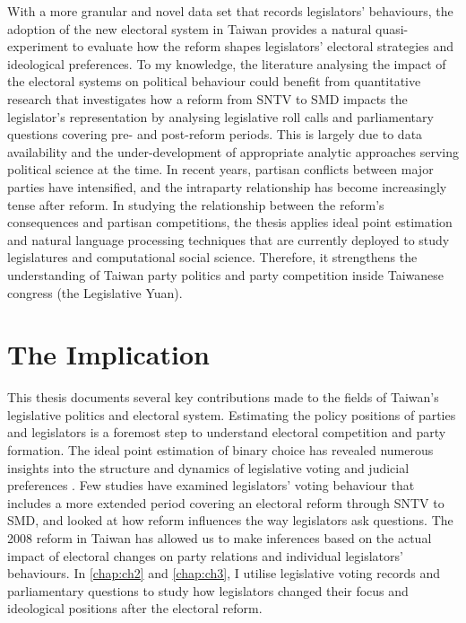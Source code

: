 With a more granular and novel data set that records legislators' behaviours, the adoption of the new electoral system in Taiwan provides a natural quasi-experiment to evaluate how the reform shapes legislators' electoral strategies and ideological preferences. To my knowledge, the literature analysing the impact of the electoral systems on political behaviour could benefit from quantitative research that investigates how a reform from SNTV to SMD impacts the legislator's representation by analysing legislative roll calls and parliamentary questions covering pre- and post-reform periods. This is largely due to data availability and the under-development of appropriate analytic approaches serving political science at the time. In recent years, partisan conflicts between major parties have intensified, and the intraparty relationship has become increasingly tense after reform. In studying the relationship between the reform's consequences and partisan competitions, the thesis applies ideal point estimation and natural language processing techniques that are currently deployed to study legislatures and computational social science. Therefore, it strengthens the understanding of Taiwan party politics and party competition inside Taiwanese congress (the Legislative Yuan). 

\section*{\centering The Implication}
This thesis documents several key contributions made to the fields of Taiwan's legislative politics and electoral system. Estimating the policy positions of parties and legislators is a foremost step to understand electoral competition and party formation. The ideal point estimation of binary choice has revealed numerous insights into the structure and dynamics of legislative voting \citep[e.g.,][]{Carroll2013, Gray2019} and judicial preferences \citep[][]{Martin2007, Epstein2007}. Few studies have examined legislators' voting behaviour that includes a more extended period covering an electoral reform through SNTV to SMD, and looked at how reform influences the way legislators ask questions. The 2008 reform in Taiwan has allowed us to make inferences based on the actual impact of electoral changes on party relations and individual legislators' behaviours. In \autoref{chap:ch2} and \autoref{chap:ch3}, I utilise legislative voting records and parliamentary questions to study how legislators changed their focus and ideological positions after the electoral reform.

